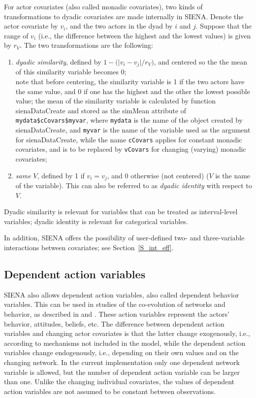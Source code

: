 \documentclass[a4paper,fleqn,11pt]{article}
\newcommand{\+}{\, + \,}
\newcommand{\sfn}[1]{\textsf{#1}}
\newcommand{\SI}{{\sf SIENA }}
\newcommand{\si}{{\sf SIENA}}
\begin{document}
{For actor covariates (also called monadic covariates),
two kinds of transformations to dyadic covariates
are made internally in \si. Denote the actor covariate by $v_i$,
and the two actors in the dyad by $i$ and $j$.
Suppose that the range of $v_i$ (i.e., the difference between the
highest and the lowest values) is given by $r_V$.
The two transformations are the following:
\begin{enumerate}
\item \emph{dyadic similarity}, defined by
      $ 1 - \big( \vert v_i - v_j \vert / r_V \big) $,
      and centered so the the mean of this similarity variable becomes 0;\\
      note that before centering, the similarity variable is 1 if
      the two actors have the same value, and 0 if one has the highest and the
      other the lowest possible value;
      the mean of the similarity variable is calculated by function
      \sfn{sienaDataCreate} and stored as the \sfn{simMean} attribute
      of \texttt{mydata\$cCovars\$myvar}, where \texttt{mydata} is the name
      of the object created by \sfn{sienaDataCreate}, and \texttt{myvar}
      is the name of the variable used as the argument for
      \sfn{sienaDataCreate}, while the name \texttt{cCovars} applies for
      constant monadic covariates, and is to be replaced by \texttt{vCovars}
      for changing (varying) monadic covariates;
\item \emph{same $V$}, defined by 1 if $v_i = v_j$,
      and 0 otherwise (not centered) ($V$ is the name of the variable).
      This can also be referred to as \emph{dyadic identity}
      with respect to $V$.
\end{enumerate}
Dyadic similarity is relevant for variables that can be treated as
interval-level variables; dyadic identity is relevant for categorical variables.

In addition, \SI offers the possibility of user-defined two- and three-variable
interactions between covariates; see Section~\ref{S_int_eff}.


\subsection{Dependent action variables}
\label{S_depaction}

\SI also allows dependent action variables,
also called dependent behavior variables. This can be used in studies
of the co-evolution of networks and behavior, as described
in \citet*{SnijdersEA07} and \citet*{SteglichEA10}.
These action variables represent the actors' behavior, attitudes, beliefs, etc.
The difference between dependent action variables and changing actor
covariates is that the latter change exogenously, i.e., according
to mechanisms not included in the model, while the dependent
action variables change endogenously, i.e.,
depending on their own values and on the changing network.
In the current implementation only one dependent network variable is
allowed, but the number of dependent action variable can be larger than one.
Unlike the changing individual covariates,
the values of dependent action variables are not assumed to be
constant between observations.

}
\end{document}

